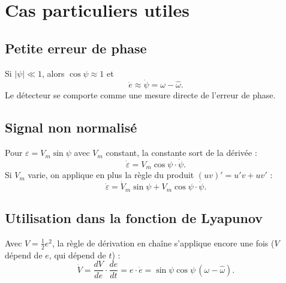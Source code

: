 \documentclass[11pt,a4paper]{article}
\numberwithin{equation}{section}
\newcommand{\hw}{\hat{\omega}}
\begin{document}
\section{Cas particuliers utiles}

\subsection*{Petite erreur de phase}
Si $|\psi|\ll1$, alors $\cos\psi\approx1$ et
\begin{equation}
\dot e\approx\dot\psi = \omega-\hw .
\end{equation}
Le détecteur se comporte comme une mesure directe de l'erreur de phase.

\subsection*{Signal non normalisé}
Pour $\varepsilon = V_m\sin\psi$ avec $V_m$ constant, la constante sort de la dérivée :
\begin{equation}
\dot\varepsilon = V_m\cos\psi\cdot\dot\psi .
\end{equation}
Si $V_m$ varie, on applique en plus la règle du produit $(uv)'=u'v+uv'$ :
\begin{equation}
\dot\varepsilon = \dot V_m\sin\psi + V_m\cos\psi\cdot\dot\psi .
\end{equation}

\subsection*{Utilisation dans la fonction de Lyapunov}
Avec $V=\frac12e^2$, la règle de dérivation en chaîne s'applique encore une fois
($V$ dépend de $e$, qui dépend de $t$) :
\begin{equation}
\dot V = \frac{dV}{de}\cdot\frac{de}{dt} = e\cdot\dot e = \sin\psi\cos\psi\,(\omega-\hw).
\end{equation}
\end{document}
